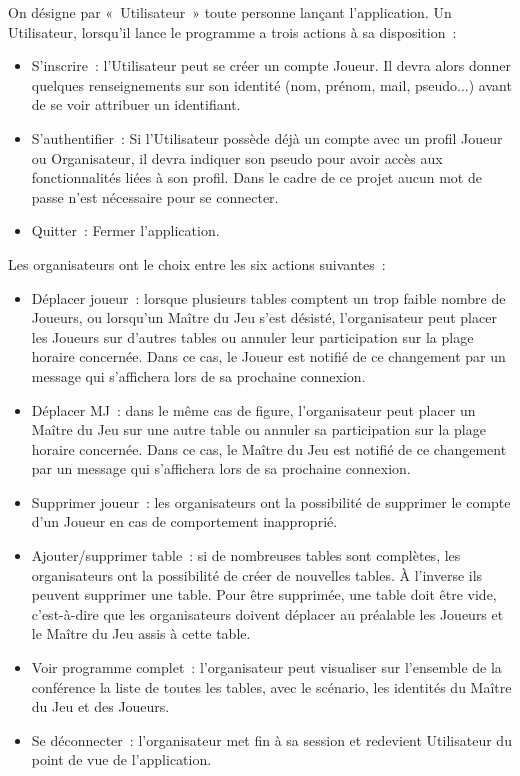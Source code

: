 \documentclass[11pt]{article}
\begin{document}
On désigne par «~Utilisateur~» toute personne lançant l'application. Un Utilisateur, lorsqu'il lance le programme a trois actions à sa disposition~:
\begin{itemize}
    \item{S'inscrire~: l'Utilisateur peut se créer un compte Joueur. Il devra alors donner quelques renseignements sur son identité (nom, prénom, mail, pseudo...) avant de se voir attribuer un identifiant.}
    \item{S'authentifier~: Si l'Utilisateur possède déjà un compte avec un profil Joueur ou Organisateur, il devra indiquer son pseudo pour avoir accès aux fonctionnalités liées à son profil. Dans le cadre de ce projet aucun mot de passe n'est nécessaire pour se connecter.}
    \item{Quitter~:  Fermer l'application.\\}
\end{itemize}

Les organisateurs ont le choix entre les six actions suivantes~:
\begin{itemize}
    \item {Déplacer joueur~: lorsque plusieurs tables comptent un trop faible nombre de Joueurs, ou lorsqu'un Maître du Jeu s'est désisté, l'organisateur peut placer les Joueurs sur d'autres tables ou annuler leur participation sur la plage horaire concernée. Dans ce cas, le Joueur est notifié de ce changement par un message qui s'affichera lors de sa prochaine connexion.}
    \item{Déplacer MJ~: dans le même cas de figure, l'organisateur peut placer un Maître du Jeu sur une autre table ou annuler sa participation sur la plage horaire concernée. Dans ce cas, le Maître du Jeu est notifié de ce changement par un message qui s'affichera lors de sa prochaine connexion.}
    \item{Supprimer joueur~: les organisateurs ont la possibilité de supprimer le compte d'un Joueur en cas de comportement inapproprié.}
    \item{Ajouter/supprimer table~: si de nombreuses tables sont complètes, les organisateurs ont la possibilité de créer de nouvelles tables. À l'inverse ils peuvent supprimer une table. Pour être supprimée, une table doit être vide, c'est-à-dire que les organisateurs doivent déplacer au préalable les Joueurs et le Maître du Jeu assis à cette table.}
    \item{Voir programme complet~: l'organisateur peut visualiser sur l'ensemble de la conférence la liste de toutes les tables, avec le scénario, les identités du Maître du Jeu et des Joueurs.}
    \item{Se déconnecter~: l'organisateur met fin à sa session et redevient Utilisateur du point de vue de l'application.\\}
\end{itemize}
\end{document}
